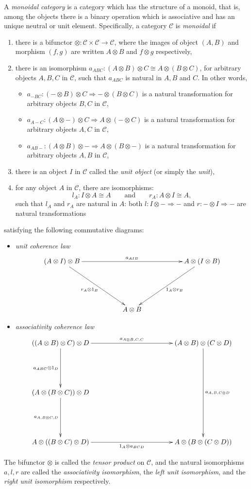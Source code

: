 A \emph{monoidal category} is a category which has the structure of a monoid, that is, among the objects there is a binary operation which is associative and has an unique neutral or unit element.   Specifically, a category $\mathcal{C}$ is \emph{monoidal} if
\begin{enumerate}
\item there is a bifunctor $\otimes: \mathcal{C}\times\mathcal{C}\to \mathcal{C}$, where the images of object $(A,B)$ and morphism $(f,g)$ are written $A\otimes B$ and $f\otimes g$ respectively,
\item there is an isomorphism $a_{ABC}: (A\otimes B)\otimes C \cong A\otimes (B\otimes C)$, for arbitrary objects $A,B,C$ in $\mathcal{C}$, such that $a_{ABC}$ is natural in $A,B$ and $C$.  In other words,
\begin{itemize}
\item $a_{-BC}: (-\otimes B)\otimes C \Rightarrow -\otimes(B\otimes C)$ is a natural transformation for arbitrary objects $B,C$ in $\mathcal{C}$,
\item $a_{A-C}: (A\otimes -)\otimes C \Rightarrow A\otimes(-\otimes C)$ is a natural transformation for arbitrary objects $A,C$ in $\mathcal{C}$,
\item $a_{AB-}: (A\otimes B)\otimes - \Rightarrow A\otimes(B\otimes -)$ is a natural transformation for arbitrary objects $A,B$ in $\mathcal{C}$,
\end{itemize}
\item there is an object $I$ in $\mathcal{C}$ called the \emph{unit object} (or simply the \emph{unit}),
\item for any object $A$ in $\mathcal{C}$, there are isomorphisms: 
$$l_A: I\otimes A\cong A \qquad \mbox{and} \qquad r_A: A\otimes I\cong A,$$
such that $l_A$ and $r_A$ are natural in $A$: both $l: I\otimes - \Rightarrow -$ and $r: -\otimes I\Rightarrow - $ are natural transformations
\end{enumerate}
satisfying the following commutative diagrams:
\begin{itemize}
\item \emph{unit coherence law}
$$\xymatrix@+=2cm{(A\otimes I)\otimes B \ar[rr]^{a_{AIB}} \ar[dr]_{r_A\otimes 1_B} & & A\otimes (I\otimes B) \ar[dl]^{1_A \otimes r_B} \\ & A\otimes B & }$$
\item \emph{associativity coherence law}
$$\xymatrix@+=2cm{((A\otimes B)\otimes C)\otimes D \ar[rr]^{a_{A\otimes B,C,C}} \ar[d]_{a_{ABC}\otimes 1_D} &&  (A\otimes B)\otimes (C\otimes D) \ar[dd]^{a_{A,B,C\otimes D}} \\ 
(A\otimes (B\otimes C))\otimes D \ar[d]_{a_{A,B\otimes C,D}} && \\
A\otimes ((B\otimes C)\otimes D) \ar[rr]_{1_A\otimes a_{BCD}} && A \otimes (B\otimes (C\otimes D))}$$
\end{itemize}
The bifunctor $\otimes$ is called the \emph{tensor product} on $\mathcal{C}$, and the natural isomorphisms $a,l,r$ are called the \emph{associativity isomorphism}, the \emph{left unit isomorphism}, and the \emph{right unit isomorphism} respectively.

